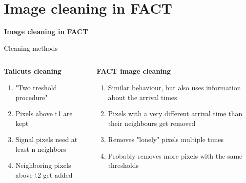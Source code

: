 \section{Image cleaning in FACT}

\begin{frame}
    \centering
    {\Huge \textbf{Image cleaning in FACT}}
\end{frame}

\begin{frame}{Cleaning methods}
    \begin{columns}[T] %
        \begin{column}{.48\textwidth}
            \textbf{Tailcuts cleaning}

            \begin{enumerate}
                \item "Two treshold procedure"
                \item Pixels above t1 are kept
                \item Signal pixels need at least n neighbors
                \item Neighboring pixels above t2 get added
            \end{enumerate}
        \end{column}
        \begin{column}{.48\textwidth}
            \textbf{FACT image cleaning}

            \begin{enumerate}
                \item Similar behaviour, but also uses information about the arrival times
                \item Pixels with a very different arrival time than their neighbours get removed
                \item Removes "lonely" pixels multiple times
                \item Probably removes more pixels with the same thresholds
            \end{enumerate}
        \end{column}
    \end{columns}
\end{frame}

